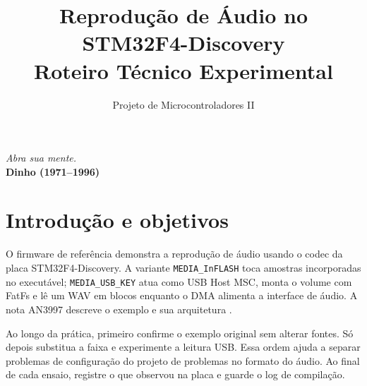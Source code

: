 \documentclass[12pt,journal,compsoc]{IEEEtran}
\begin{document}
\title{Reprodução de Áudio no STM32F4-Discovery\\Roteiro Técnico Experimental}
\author{Projeto de Microcontroladores II}
\maketitle
\IEEEdisplaynontitleabstractindextext
\IEEEpeerreviewmaketitle

\begin{flushright}
    {\textit{Abra sua mente.}\\
      \textbf{Dinho (1971--1996)}}
\end{flushright} 

\section{Introdução e objetivos}
O firmware de referência demonstra a reprodução de áudio usando o codec da placa STM32F4-Discovery. A variante \texttt{MEDIA\_InFLASH} toca amostras incorporadas no executável; \texttt{MEDIA\_USB\_KEY} atua como USB Host MSC, monta o volume com FatFs e lê um WAV em blocos enquanto o DMA alimenta a interface de áudio. A nota AN3997 descreve o exemplo e sua arquitetura \cite{an3997}.

Ao longo da prática, primeiro confirme o exemplo original sem alterar fontes. Só depois substitua a faixa e experimente a leitura USB. Essa ordem ajuda a separar problemas de configuração do projeto de problemas no formato do áudio. Ao final de cada ensaio, registre o que observou na placa e guarde o log de compilação.
\end{document}
